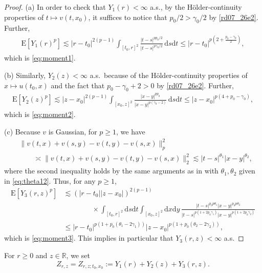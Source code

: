 \documentclass[12pt,a4paper]{article}
\newcommand{\R}{{\mathbb{R}}}
\newcommand{\E}{\mathrm{E}}
\renewcommand{\d}{\mathrm{d}}
\newcommand{\<}{\langle}
\renewcommand{\>}{\rangle}
\begin{document}
 
 \begin{proof}
 (a) In order to check that $Y_1(r)<\infty$ a.s., by the H\"older-continuity properties of $t \mapsto v(t, x_0)$, it suffices to notice that $p_0/2 > \gamma_0/2$ by \eqref{rd07_26e2}. Further,
 \begin{align*}%
\E[Y_1(r)^p] \lesssim  |r-t_0|^{2(p-1)}\int_{[t_0,r]^2} \frac {|t-s|^{pp_0/2}}{|t-s|^{p\gamma_0/2}} \, \d s\d t
\le  |r-t_0|^{p(2+ \frac { p_0-\gamma_0}2)},
\end{align*}
 which is \eqref{eq:moment1}.

(b)  Similarly, $Y_2(z)<\infty$ a.s.~because of the H\"older-continuity properties of $x \mapsto u(t_0, x)$ and the fact that $p_0 - \gamma_0 + 2 > 0$ by \eqref{rd07_26e2}. Further,
\begin{align*}%
\E[Y_2(z)^p] \lesssim |z-x_0|^{2(p-1)}\int_{[x_0,z]^2} \frac {|x-y|^{pp_0}}{|x-y|^{p(\gamma_0-2)}}\, \d s\d t
\le  |z-x_0|^{p(4+p_0-\gamma_0)},
\end{align*}
which is \eqref{eq:moment2}.

(c) Because  $v$ is Gaussian, for $p\geq1$, we have 
\begin{align}\label{eq:rectangle}
&\|v(t,x)+v(s,y)-v(t,y)-v(s,x)\|_p^2 \nonumber\\
&\qquad \asymp \|v(t,x)+v(s,y)-v(t,y)-v(s,x)\|_2^2 \lesssim |t-s|^{\theta_1}|x-y|^{\theta_2},
\end{align}
where the second inequality holds by the same arguments as in \cite[Lemma 3.1]{DP1} with $\theta_1, \theta_2$ given in \eqref{eq:theta12}. 
Thus, for any $p\ge 1$, 
\begin{align*}%
   \E[Y_3(r,z)^p]  &\lesssim (|r-t_0||z-x_0|)^{2(p-1)}\nonumber \\
&\qquad\qquad \times \int_{[t_0,r]^2}\d s\d t \int_{[x_0,z]^2} \d x\d y\, \frac {|t-s|^{p_0 p \theta_1} |x-y|^{p_0p\theta_2}}{|t-s|^{p(1+2p_0\gamma_1)}|x-y|^{p(1+2p_0\gamma_2)}} \nonumber\\
&\le |r-t_0|^{p(1+p_0(\theta_1-2\gamma_1))}|z-x_0|^{p(1+p_0(\theta_2-2\gamma_2))},
\end{align*}
which is \eqref{eq:moment3}. This implies in particular that $Y_3(r, z) < \infty$ a.s.
\end{proof}

For $r\ge 0$ and $z \in \R$,  we set 
 \begin{equation}\label{rd04_04e1}
 Z_{r,z} = Z_{r, z; t_0, x_0} :=  Y_1(r) + Y_2(z) + Y_3(r,z).
 \end{equation}
\end{document}
